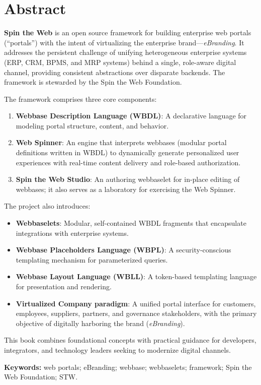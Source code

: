 
\chapter*{Abstract}
\textbf{Spin the Web} is an open source framework for building enterprise web portals (``portals'') with the intent of virtualizing the enterprise brand—\textit{eBranding}. It addresses the persistent challenge of unifying heterogeneous enterprise systems (ERP, CRM, BPMS, and MRP systems) behind a single, role-aware digital channel, providing consistent abstractions over disparate backends. The framework is stewarded by the Spin the Web Foundation.

The framework comprises three core components:
\begin{enumerate}
\item \textbf{Webbase Description Language (WBDL)}: A declarative language for modeling portal structure, content, and behavior.
\item \textbf{Web Spinner}: An engine that interprets webbases (modular portal definitions written in WBDL) to dynamically generate personalized user experiences with real-time content delivery and role-based authorization.
\item \textbf{Spin the Web Studio}: An authoring webbaselet for in-place editing of webbases; it also serves as a laboratory for exercising the Web Spinner.
\end{enumerate}

The project also introduces:
\begin{itemize}
\item \textbf{Webbaselets}: Modular, self-contained WBDL fragments that encapsulate integrations with enterprise systems.
\item \textbf{Webbase Placeholders Language (WBPL)}: A security-conscious templating mechanism for parameterized queries.
\item \textbf{Webbase Layout Language (WBLL)}: A token-based templating language for presentation and rendering.
\item \textbf{Virtualized Company paradigm}: A unified portal interface for customers, employees, suppliers, partners, and governance stakeholders, with the primary objective of digitally harboring the brand (\textit{eBranding}).
\end{itemize}

This book combines foundational concepts with practical guidance for developers, integrators, and technology leaders seeking to modernize digital channels.

\textbf{Keywords:} web portals; eBranding; webbase; webbaselets; framework; Spin the Web Foundation; STW.

\clearpage
